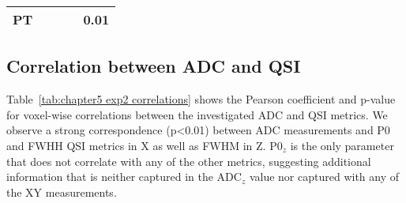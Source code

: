 \begin{table}
{\begin{tabular}{rrrrr}
        PT    &       &       &       & \textbf{0.01} \\
        \bottomrule
        \end{tabular}%
        \label{tab:chap5exp2_qsiz hotelling}%
  }\hspace{0.2cm}
  \label{tab:chapter6 hotelling}%
\end{table}%

\subsection{Correlation between ADC and QSI}
\label{par:chapter5 exp2 correlation}
Table~\ref{tab:chapter5 exp2 correlations} shows the Pearson coefficient and p-value for voxel-wise correlations between the investigated ADC and QSI metrics. We observe a strong correspondence (p<0.01) between ADC measurements and P0 and FWHH QSI metrics in X as well as FWHM in Z. P0$_z$ is the only parameter that does not correlate with any of the other metrics, suggesting additional information that is neither captured in the ADC$_z$ value nor captured with any of the XY measurements.%

